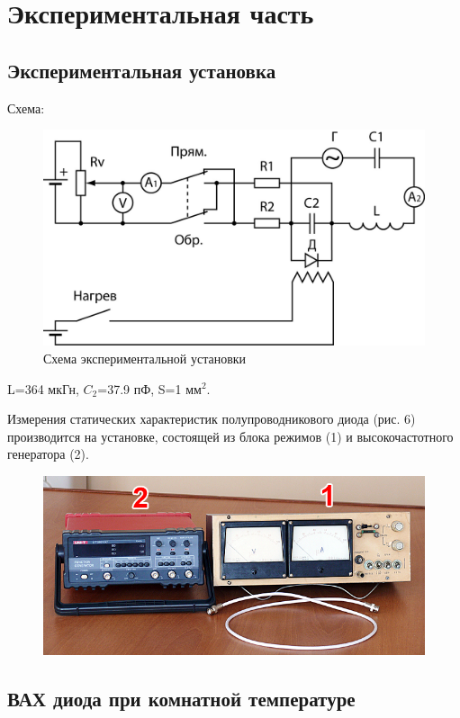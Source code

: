 \section{Экспериментальная часть}
\subsection{Экспериментальная установка}
Схема:
\begin{figure}[h!]
	\centering
	\includegraphics[width=0.5\linewidth]{fig/fig5.jpg}
	\caption{Схема экспериментальной установки}
	\label{fig:5}
\end{figure}

L=364 мкГн, $C_2$=37.9 пФ, S=1 мм$^2$.

Измерения статических характеристик полупроводникового диода (рис. 6) производится на установке, состоящей из блока режимов (1) и высокочастотного генератора (2).
\begin{figure}[h!]
	\centering
	\includegraphics[width=0.6\linewidth]{fig/fig6.jpg}
	\caption{}
	\label{fig:6}
\end{figure}

\subsection{ВАХ диода при комнатной температуре}


